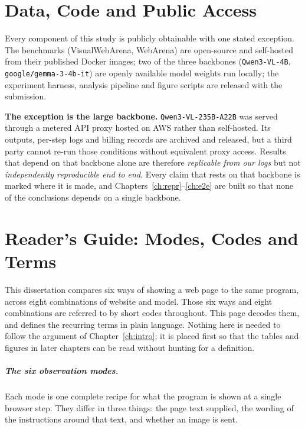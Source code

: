 \chapter*{Data, Code and Public Access}

Every component of this study is publicly obtainable with one stated exception.
The benchmarks (VisualWebArena, WebArena) are open-source and self-hosted from
their published Docker images; two of the three backbones
(\texttt{Qwen3-VL-4B}, \texttt{google/gemma-3-4b-it}) are openly available model
weights run locally; the experiment harness, analysis pipeline and figure
scripts are released with the submission.

\textbf{The exception is the large backbone.} \texttt{Qwen3-VL-235B-A22B} was
served through a metered API proxy hosted on AWS rather than self-hosted. Its outputs,
per-step logs and billing records are archived and released, but a third party
cannot re-run those conditions without equivalent proxy access. Results that
depend on that backbone alone are therefore \emph{replicable from our logs} but
not \emph{independently reproducible end to end}. Every claim that rests on
that backbone is marked where it is made, and
Chapters~\ref{ch:repr}--\ref{ch:e2e} are built so that none of the conclusions
depends on a single backbone.

\clearpage
\tableofcontents
\listoffigures
\listoftables
\clearpage

\chapter*{Reader's Guide: Modes, Codes and Terms}

This dissertation compares six ways of showing a web page to the same program,
across eight combinations of website and model. Those six ways and eight
combinations are referred to by short codes throughout. This page decodes them,
and defines the recurring terms in plain language. Nothing here is needed to
follow the argument of Chapter~\ref{ch:intro}; it is placed first so that the
tables and figures in later chapters can be read without hunting for a
definition.

\paragraph{The six observation modes.} Each mode is one complete recipe for what
the program is shown at a single browser step. They differ in three things: the
page text supplied, the wording of the instructions around that text, and
whether an image is sent.


